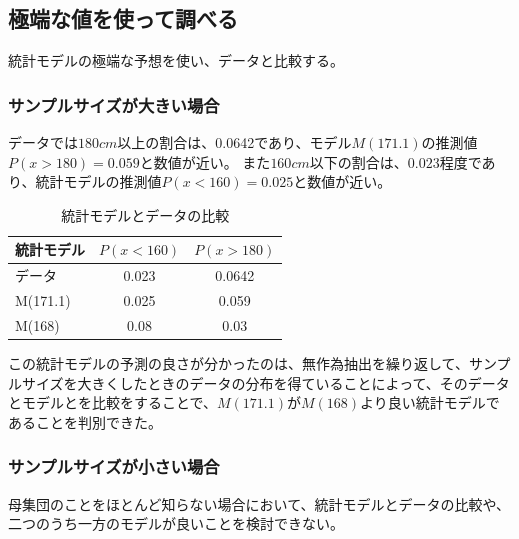 \subsection{極端な値を使って調べる}
統計モデルの極端な予想を使い、データと比較する。
\subsubsection{サンプルサイズが大きい場合}

データでは$180cm$以上の割合は、0.0642であり、モデル$M(171.1)$の推測値$P(x>180)=0.059$と数値が近い。
また$160cm$以下の割合は、$0.023$程度であり、統計モデルの推測値$P(x<160)=0.025$と数値が近い。

\begin{table}[hbtp]
    \caption{統計モデルとデータの比較}
    \label{table:data_type}
    \centering
    \begin{tabular}{lcc}
    統計モデル  & $P(x<160)$  & $P(x>180)$   \\
    \hline \hline
    データ &  0.023 &  0.0642\\
    M(171.1) & 0.025 & 0.059  \\
    M(168) &  0.08 & 0.03 \\
      \hline
    \end{tabular}
  \end{table}
この統計モデルの予測の良さが分かったのは、無作為抽出を繰り返して、サンプルサイズを大きくしたときのデータの分布を得ていることによって、そのデータとモデルとを比較をすることで、$M(171.1)$が$M(168)$より良い統計モデルであることを判別できた。

\subsubsection{サンプルサイズが小さい場合}
母集団のことをほとんど知らない場合において、統計モデルとデータの比較や、二つのうち一方のモデルが良いことを検討できない。

